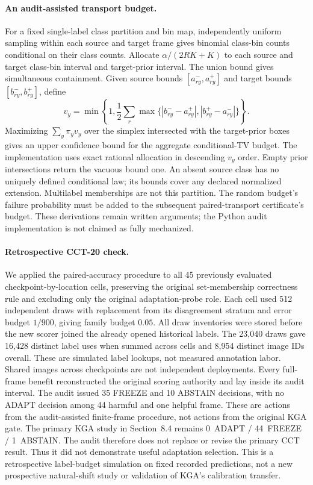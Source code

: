\paragraph{An audit-assisted transport budget.}
For a fixed single-label class partition and bin map, independently uniform
sampling within each source and target frame gives binomial class-bin counts
conditional on their class counts. Allocate $\alpha/(2RK+K)$ to each source
and target class-bin interval and target-prior interval. The union bound gives
simultaneous containment. Given source bounds $[a^-_{ry},a^+_{ry}]$ and target
bounds $[b^-_{ry},b^+_{ry}]$, define
\[
 v_y=\min\left\{1,\frac12\sum_r
 \max\{|b^-_{ry}-a^+_{ry}|,|b^+_{ry}-a^-_{ry}|\}\right\}.
\]
Maximizing $\sum_y\pi_yv_y$ over the simplex intersected with the target-prior
boxes gives an upper confidence bound for the aggregate conditional-TV
budget. The implementation uses exact rational allocation in descending
$v_y$ order. Empty prior intersections return the vacuous bound one. An absent
source class has no uniquely defined conditional law; its bounds cover any
declared normalized extension. Multilabel memberships are not this partition.
The random budget's failure probability must be added to the subsequent
paired-transport certificate's budget. These derivations remain written
arguments; the Python audit implementation is not claimed as fully mechanized.

\paragraph{Retrospective CCT-20 check.}
We applied the paired-accuracy procedure to all 45 previously evaluated
checkpoint-by-location cells, preserving the original set-membership
correctness rule and excluding only the original adaptation-probe role.
Each cell used 512 independent draws with replacement from its disagreement
stratum and error budget $1/900$, giving family budget $0.05$. All draw
inventories were stored before the new scorer joined the already opened
historical labels. The 23,040 draws gave 16,428 distinct label uses when
summed across cells and 8,954 distinct image IDs overall. These are simulated
label lookups, not measured annotation labor. Shared images across checkpoints
are not independent deployments. Every full-frame benefit reconstructed the original scoring
authority and lay inside its audit interval. The audit issued 35 FREEZE and
10 ABSTAIN decisions, with no ADAPT decision among 44 harmful and one helpful
frame. These are actions from the audit-assisted finite-frame procedure, not actions from the original KGA gate. The primary KGA study in Section~8.4 remains 0~ADAPT / 44~FREEZE / 1~ABSTAIN. The audit therefore does not replace or revise the primary CCT result. Thus it did not demonstrate useful adaptation selection. This is a
retrospective label-budget simulation on fixed recorded predictions, not a
new prospective natural-shift study or validation of KGA's calibration transfer.
